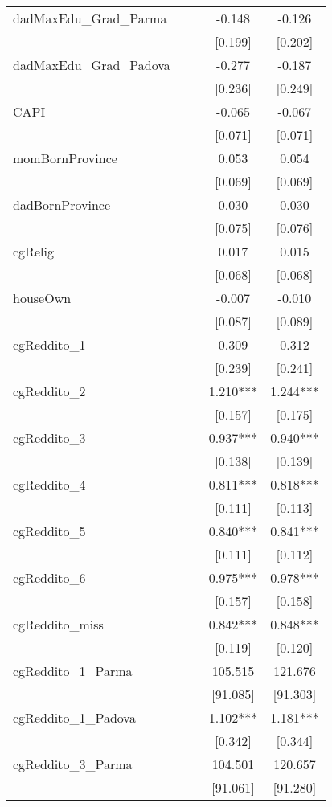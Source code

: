 \documentclass[]{article}
\begin{document}
\begin{tabular}{lcccc}
dadMaxEdu\_Grad\_Parma &  &  & -0.148 & -0.126 \\
 &  &  & [0.199] & [0.202] \\
dadMaxEdu\_Grad\_Padova &  &  & -0.277 & -0.187 \\
 &  &  & [0.236] & [0.249] \\
CAPI &  &  & -0.065 & -0.067 \\
 &  &  & [0.071] & [0.071] \\
momBornProvince &  &  & 0.053 & 0.054 \\
 &  &  & [0.069] & [0.069] \\
dadBornProvince &  &  & 0.030 & 0.030 \\
 &  &  & [0.075] & [0.076] \\
cgRelig &  &  & 0.017 & 0.015 \\
 &  &  & [0.068] & [0.068] \\
houseOwn &  &  & -0.007 & -0.010 \\
 &  &  & [0.087] & [0.089] \\
cgReddito\_1 &  &  & 0.309 & 0.312 \\
 &  &  & [0.239] & [0.241] \\
cgReddito\_2 &  &  & 1.210*** & 1.244*** \\
 &  &  & [0.157] & [0.175] \\
cgReddito\_3 &  &  & 0.937*** & 0.940*** \\
 &  &  & [0.138] & [0.139] \\
cgReddito\_4 &  &  & 0.811*** & 0.818*** \\
 &  &  & [0.111] & [0.113] \\
cgReddito\_5 &  &  & 0.840*** & 0.841*** \\
 &  &  & [0.111] & [0.112] \\
cgReddito\_6 &  &  & 0.975*** & 0.978*** \\
 &  &  & [0.157] & [0.158] \\
cgReddito\_miss &  &  & 0.842*** & 0.848*** \\
 &  &  & [0.119] & [0.120] \\
cgReddito\_1\_Parma &  &  & 105.515 & 121.676 \\
 &  &  & [91.085] & [91.303] \\
cgReddito\_1\_Padova &  &  & 1.102*** & 1.181*** \\
 &  &  & [0.342] & [0.344] \\
cgReddito\_3\_Parma &  &  & 104.501 & 120.657 \\
 &  &  & [91.061] & [91.280] \\

\end{tabular}
\end{document}
